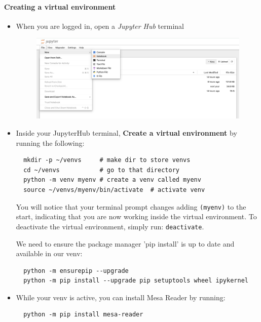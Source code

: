 \documentclass[11pt,a4paper]{article}
\begin{document}
\paragraph{Creating a virtual environment}


\begin{itemize}

  \item When you are logged in, open a \textit{Jupyter Hub} terminal

\begin{figure}[h] %
    \centering
    \includegraphics[width=\textwidth]{open_jupyternotebook.png} %
    \caption*{ }
    \label{fig:myplot}
\end{figure}

  \item Inside your JupyterHub terminal, \textbf{Create a virtual environment} by running the following:
  \begin{lstlisting}
  mkdir -p ~/venvs     # make dir to store venvs
  cd ~/venvs           # go to that directory
  python -m venv myenv # create a venv called myenv
  source ~/venvs/myenv/bin/activate  # activate venv
  \end{lstlisting}

  You will notice that your terminal prompt changes adding \texttt{(myenv)} to the start, indicating that you are now working inside the virtual environment. To deactivate the virtual environment, simply run: \texttt{deactivate}.

  We need to ensure the package manager 'pip install' is up to date and available in our venv: 
  \begin{lstlisting}
  python -m ensurepip --upgrade
  python -m pip install --upgrade pip setuptools wheel ipykernel
  \end{lstlisting}


  \item While your venv is active, you can install Mesa Reader by running:
\begin{lstlisting}
  python -m pip install mesa-reader
\end{lstlisting}


\end{itemize}
\end{document}
